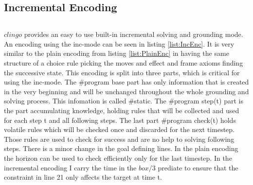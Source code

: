 \documentclass[12pt,a4paper,oneside]{report}
\begin{document}
\subsection{Incremental Encoding} \label{IncEnc}

\begin{lstlisting}[caption={Incremental Encoding},label=list:IncEnc]
\end{lstlisting}
$clingo$ provides an easy to use built-in incremental solving  and grounding mode. An encoding using the inc-mode can be seen in listing \ref{list:IncEnc}. It is very similar to the plain encoding from listing \ref{list:PlainEnc} in having the same structure of a choice rule picking the moves and effect and frame axioms finding the successive state. This encoding is split into three parts, which is critical for using the inc-mode. The \#program base part has only information that is created in the very beginning and will be unchanged throughout the whole grounding and solving process. This infomation is called \#static. The \#program step(t) part is the part accumulating knowledge, holding rules that will be collected and used for each step t and all following steps. The last part \#program check(t) holds volatile rules which will be checked once and discarded for the next timestep. Those rules are used to check for success and are no help to solving following steps.
There is a minor change in the goal defining lines. In the plain encoding the horizon can be used to check efficiently only for the last timestep. In the incremental encoding I carry the time in the $box/3$ prediate to ensure that the constraint in line 21 only affects the target at time t.
\\
\end{document}
